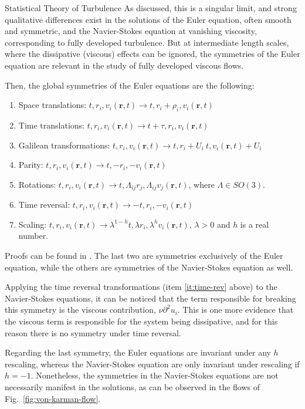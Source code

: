 \begin{chapter}{Statistical Theory of Turbulence}
As discussed, this is a singular limit, and
strong qualitative differences exist
in the solutions of the Euler equation, often smooth
and symmetric, and the Navier-Stokes equation at vanishing
viscosity, corresponding to fully developed turbulence.
But at intermediate length scales, where the dissipative (viscous) effects
can be ignored, the symmetries of the Euler equation are relevant
in the study of fully developed viscous flows.

Then, the global symmetries of the Euler equations are the following:
\begin{enumerate}
\item Space translations: $t, r_i, v_i(\bm{r},t) \to t, r_i+\rho_i, v_i(\bm{r},t)$
\item Time translations: $t, r_i, v_i(\bm{r},t) \to t+\tau, r_i, v_i(\bm{r},t) $
\item Galilean transformations: $t,r_i,v_i(\bm{r},t) \to t, r_i + U_i \ t, v_i(\bm{r},t) + U_i$
\item Parity: $t,r_i,v_i(\bm{r},t) \to t,-r_i,-v_i(\bm{r},t)$
\item Rotations: $t,r_i,v_i(\bm{r},t) \to t, \Lambda_{ij} r_j, \Lambda_{ij} v_j(\bm{r},t)$,
 where $\Lambda \in SO(3)$.
\item Time reversal: $t,r_i,v_i(\bm{r},t) \to -t,r_i,-v_i(\bm{r},t)$ \label{it:time-rev}
\item Scaling: $t,r_i,v_i(\bm{r},t) \to \lambda^{1-h} t, \lambda r_i, \lambda^h v_i(\bm{r},t)$, $\lambda > 0$ and $h$ is a real number. \label{it:scaling}
\end{enumerate}
Proofs can be found in \textcite{moriconi2008introducao}.
The last two are symmetries exclusively of the Euler equation,
while the others are symmetries of the Navier-Stokes equation as well.

Applying the time reversal transformations (item \ref{it:time-rev} above) to the Navier-Stokes equations,
it can be noticed that the term responsible for breaking this symmetry is the
viscous contribution, $\nu \partial^2 u_i$. This is one more evidence that the viscous
term is responsible for the system being dissipative, and for this reason
there is no symmetry under time reversal.

Regarding the last symmetry, the Euler equations are invariant under any $h$ rescaling, whereas the Navier-Stokes equation are only invariant under rescaling if $h=-1$.
Nonetheless, the symmetries in the Navier-Stokes equations are not necessarily manifest in the solutions, as can be observed in the flows of Fig.~\ref{fig:von-karman-flow}.


\end{chapter}
